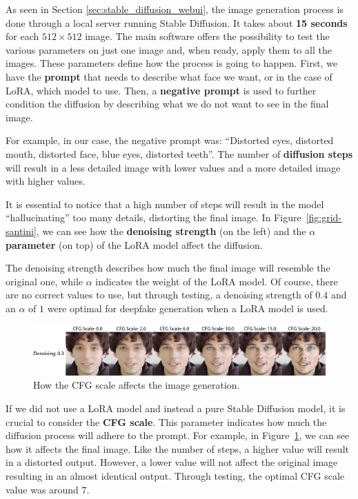 \documentclass[preprint]{elsarticle}
\begin{document}
As seen in Section \ref{sec:stable_diffusion_webui}, the image generation process is done through 
a local server running Stable Diffusion.  It takes about \textbf{15 seconds} for each $512 \times 512$ image.  The main software offers the possibility to test the various parameters  on just one image and, when ready, apply them to all the images.  These parameters define how the process is going to happen.
First, we have the \textbf{prompt} that needs to describe what face we want, or in the case of LoRA, 
which model to use.
Then, a \textbf{negative prompt} is used to further condition the diffusion by  describing what we do not want to see in the final image. 

For example, in our case, the negative prompt was: ``Distorted eyes, distorted mouth, distorted face, blue eyes, distorted teeth''. The number of \textbf{diffusion steps} will result in a less detailed image with lower values and  a more detailed image with higher values. 

It is essential to notice that a high number of steps will result in the model ``hallucinating'' too many details, distorting the final image. In Figure~\ref{fig:grid-santini}, we can see how the \textbf{denoising strength} (on the left) and the \textbf{$\alpha$ parameter} (on top) of the LoRA model affect the diffusion. 

The denoising strength describes how much the final image will resemble the original one, while $\alpha$ indicates the weight of the LoRA model. Of course, there are no correct values to use, but through testing, a denoising strength of $0.4$ and an $\alpha$ of $1$ were optimal for deepfake generation when a LoRA model is used. 

\begin{figure}[t]
	\centering
	\includegraphics[width=\textwidth, keepaspectratio]{img/project_img/cfg-examples.png}
	\caption{How the CFG scale affects the image generation.}
	\label{fig:cfg-examples}
\end{figure}

If we did not use a LoRA model and instead a pure Stable Diffusion model, 
it is crucial to consider the \textbf{CFG scale}. 
This parameter indicates how much the diffusion process will adhere to the prompt.  For example, in Figure~\ref{fig:cfg-examples}, we can see how it affects the final image.  Like the number of steps, a higher value will result in a distorted output. However, a lower value will not affect the original image resulting in an almost identical output. Through testing, the optimal CFG scale value was around $7$.
\end{document}
